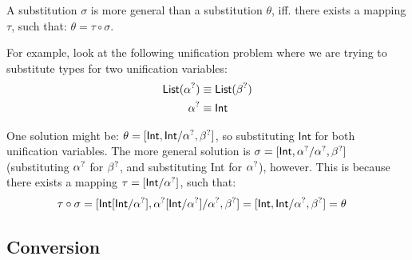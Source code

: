 \documentclass[twoside,12pt,a4paper]{article}
\begin{document}
\begin{definition} 
    A substitution $\sigma$ is more general than a substitution $\theta$, iff. there exists a mapping $\tau$, such that: $\theta = \tau \circ \sigma$.
\end{definition} %

For example, look at the following unification problem where we are trying to substitute types for two unification variables:
\begin{align*}
    \mathsf{List}(\alpha^?) &\equiv \mathsf{List}(\beta^?)\\
    \alpha^? &\equiv \mathsf{Int}
\end{align*}

One solution might be: $\theta = [\mathsf{Int, Int / \alpha^?, \beta^?}]$, 
so substituting $\mathsf{Int}$ for both unification variables.
The more general solution is $\sigma = [\mathsf{Int,\alpha^? / \alpha^?, \beta^?}]$ (substituting $\alpha^?$ for $\beta^?$, and substituting Int for $\alpha^?$), however.
This is because there exists a mapping $\tau = [\mathsf{Int / \alpha^?}]$, such that:
\begin{align*}
    \tau \circ \sigma &= [\mathsf{Int[Int/\alpha^?], \alpha^?[Int/\alpha^?] / \alpha^?, \beta^?]= [Int, Int / \alpha^?, \beta^?]= \theta}
\end{align*}
\iffalse
For example, for the problem $\alpha x = zx$, both $\sigma_1 = [z/\alpha]$ and $\sigma_2 = [\lambda y.zx, \lambda y.zx/ \alpha, z]$ are solutions, %
but $\sigma_1$ is more general than $\sigma_2$, since there exists a substitution $\sigma_3 = [\lambda y.zx/z]$, and:
\begin{align*}
    \sigma_3 \circ \sigma_1 = [z[\lambda y.zx/z], \lambda y.zx /\alpha, z] = [(\lambda y.zx), \lambda y.zx /\alpha, z] = \sigma_2  
\end{align*}
\fi

\subsection{Conversion}
\end{document}
